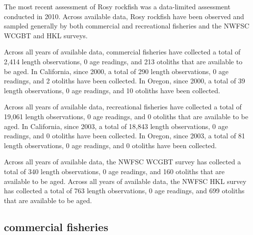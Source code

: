 \documentclass[11pt,
  english,
  letterpaper,
]{article}
\begin{document}
The most recent assessment of Rosy rockfish was a data-limited assessment conducted in 2010. Across available data, Rosy rockfish have been observed and sampled generally by both commercial and recreational fisheries and the NWFSC WCGBT and HKL surveys.

\leavevmode\tagmcend\tagstructend\par


Across all years of available data, commercial fisheries have collected a total of 2,414 length observations, 0 age readings, and 213 otoliths that are available to be aged. In California, since 2000, a total of 290 length observations, 0 age readings, and 2 otoliths have been collected. In Oregon, since 2000, a total of 39 length observations, 0 age readings, and 10 otoliths have been collected.

\leavevmode\tagmcend\tagstructend\par


Across all years of available data, recreational fisheries have collected a total of 19,061 length observations, 0 age readings, and 0 otoliths that are available to be aged. In California, since 2003, a total of 18,843 length observations, 0 age readings, and 0 otoliths have been collected. In Oregon, since 2003, a total of 81 length observations, 0 age readings, and 0 otoliths have been collected.

\leavevmode\tagmcend\tagstructend\par


Across all years of available data, the NWFSC WCGBT survey has collected a total of 340 length observations, 0 age readings, and 160 otoliths that are available to be aged. Across all years of available data, the NWFSC HKL survey has collected a total of 763 length observations, 0 age readings, and 699 otoliths that are available to be aged.

\leavevmode\tagmcend\tagstructend\par


\hypertarget{commercial-fisheries-42}{%
\subsection{commercial fisheries}\label{commercial-fisheries-42}}
\end{document}
